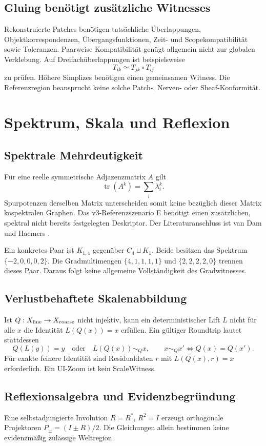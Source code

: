 \documentclass[11pt,a4paper]{article}
\newcommand{\nextsection}[2]{\clearpage{\color{accent}\small\textsf{#1}}\section{#2}}
\begin{document}
\subsection{Gluing benötigt zusätzliche Witnesses}
Rekonstruierte Patches benötigen tatsächliche Überlappungen,
Objektkorrespondenzen, Übergangsfunktionen, Zeit- und
Scopekompatibilität sowie Toleranzen. Paarweise Kompatibilität
genügt allgemein nicht zur globalen Verklebung. Auf Dreifachüberlappungen
ist beispielsweise
\[
T_{ik}\simeq T_{jk}\circ T_{ij}
\]
zu prüfen. Höhere Simplizes benötigen einen gemeinsamen Witness.
Die Referenzregion beansprucht keine solche Patch-, Nerven-
oder Sheaf-Konformität.

\nextsection{08 / STRUKTURVERTRÄGE}{Spektrum, Skala und Reflexion}
\subsection{Spektrale Mehrdeutigkeit}
Für eine reelle symmetrische Adjazenzmatrix $A$ gilt
\[
\operatorname{tr}(A^k)=\sum_i\lambda_i^k.
\]
Spurpotenzen derselben Matrix unterscheiden somit keine bezüglich
dieser Matrix kospektralen Graphen. Das v3-Referenzszenario E benötigt
einen zusätzlichen, spektral nicht bereits festgelegten Deskriptor.
Der Literaturanschluss ist van Dam und Haemers \cite{spectra}.

Ein konkretes Paar ist $K_{1,4}$ gegenüber $C_4\sqcup K_1$.
Beide besitzen das Spektrum $\{-2,0,0,0,2\}$.
Die Gradmultimengen $\{4,1,1,1,1\}$ und $\{2,2,2,2,0\}$
trennen dieses Paar. Daraus folgt keine allgemeine Vollständigkeit
des Gradwitnesses.

\subsection{Verlustbehaftete Skalenabbildung}
Ist $Q:X_{\rm fine}\to X_{\rm coarse}$ nicht injektiv, kann
ein deterministischer Lift $L$ nicht für alle $x$ die Identität
$L(Q(x))=x$ erfüllen. Ein gültiger Roundtrip lautet stattdessen
\[
Q(L(y))=y
\quad\text{oder}\quad
L(Q(x))\sim_Q x,\qquad x\sim_Q x'\iff Q(x)=Q(x').
\]
Für exakte feinere Identität sind Residualdaten $r$ mit
$L(Q(x),r)=x$ erforderlich. Ein UI-Zoom ist kein ScaleWitness.

\subsection{Reflexionsalgebra und Evidenzbegründung}
Eine selbstadjungierte Involution $R=R^\ast$, $R^2=I$ erzeugt
orthogonale Projektoren $P_\pm=(I\pm R)/2$. Die Gleichungen allein
bestimmen keine evidenzmäßig zulässige Weltregion.
\end{document}
